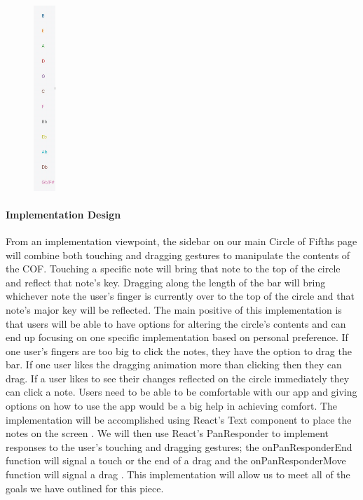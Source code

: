 \documentclass[onecolumn, draftclsnofoot,10pt, compsoc]{IEEEtran}
\begin{document}
\begin{figure}[H]
  \centering
  \includegraphics[height=7cm]{sidebar.eps}
\end{figure}

\paragraph{Implementation Design}
From an implementation viewpoint, the sidebar on our main Circle of Fifths page will combine both touching and dragging gestures to manipulate the contents of the COF.
Touching a specific note will bring that note to the top of the circle and reflect that note’s key.
Dragging along the length of the bar will bring whichever note the user’s finger is currently over to the top of the circle and that note’s major key will be reflected.
The main positive of this implementation is that users will be able to have options for altering the circle's contents and can end up focusing on one specific implementation based on personal preference.
If one user's fingers are too big to click the notes, they have the option to drag the bar.
If one user likes the dragging animation more than clicking then they can drag.
If a user likes to see their changes reflected on the circle immediately they can click a note.
Users need to be able to be comfortable with our app and giving options on how to use the app would be a big help in achieving comfort.
The implementation will be accomplished using React’s Text component to place the notes on the screen \cite{react-text}.
We will then use React’s PanResponder to implement responses to the user’s touching and dragging gestures;
the onPanResponderEnd function will signal a touch or the end of a drag and the onPanResponderMove function will signal a drag \cite{react-pan}.
This implementation will allow us to meet all of the goals we have outlined for this piece.
	
\end{document}
